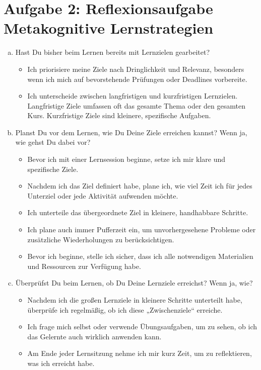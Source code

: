 \documentclass[10pt, oneside]{article}
\begin{document}
\section{Aufgabe 2: Reflexionsaufgabe Metakognitive Lernstrategien}
\begin{enumerate}[(a)]
    \item Hast Du bisher beim Lernen bereits mit Lernzielen gearbeitet?

        \begin{itemize}
            \item Ich priorisiere meine Ziele nach Dringlichkeit und Relevanz,
                besonders wenn ich mich auf bevorstehende Prüfungen oder
                Deadlines vorbereite.
            \item Ich unterscheide zwischen langfristigen und kurzfristigen
                Lernzielen. Langfristige Ziele umfassen oft das gesamte Thema
                oder den gesamten Kurs. Kurzfristige Ziele sind kleinere,
                spezifische Aufgaben.
        \end{itemize}

    \item Planst Du vor dem Lernen, wie Du Deine Ziele erreichen kannst? Wenn
        ja, wie gehst Du dabei vor?

        \begin{itemize}
            \item Bevor ich mit einer Lernsession beginne, setze ich mir klare
                und spezifische Ziele.
            \item Nachdem ich das Ziel definiert habe, plane ich, wie viel Zeit
                ich für jedes Unterziel oder jede Aktivität aufwenden möchte.
            \item Ich unterteile das übergeordnete Ziel in kleinere,
                handhabbare Schritte.
            \item Ich plane auch immer Pufferzeit ein, um unvorhergesehene
                Probleme oder zusätzliche Wiederholungen zu berücksichtigen.
            \item Bevor ich beginne, stelle ich sicher, dass ich alle
                notwendigen Materialien und Ressourcen zur Verfügung habe.
        \end{itemize}

    \item Überprüfst Du beim Lernen, ob Du Deine Lernziele erreichst? Wenn ja,
        wie?

        \begin{itemize}
            \item Nachdem ich die großen Lernziele in kleinere Schritte
                unterteilt habe, überprüfe ich regelmäßig, ob ich diese
                „Zwischenziele“ erreiche.
            \item Ich frage mich selbst oder verwende Übungsaufgaben, um zu
                sehen, ob ich das Gelernte auch wirklich anwenden kann.
            \item Am Ende jeder Lernsitzung nehme ich mir kurz Zeit, um zu
                reflektieren, was ich erreicht habe.
        \end{itemize}


\end{enumerate}
\end{document}
